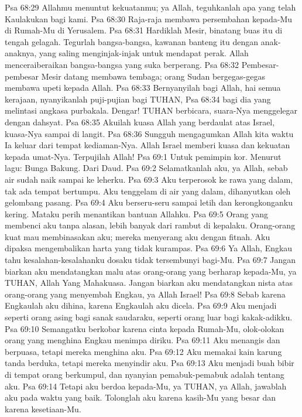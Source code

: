 Psa 68:29  Allahmu menuntut kekuatanmu; ya Allah, teguhkanlah apa yang telah Kaulakukan bagi kami.
Psa 68:30  Raja-raja membawa persembahan kepada-Mu di Rumah-Mu di Yerusalem.
Psa 68:31  Hardiklah Mesir, binatang buas itu di tengah gelagah. Tegurlah bangsa-bangsa, kawanan banteng itu dengan anak-anaknya, yang saling menginjak-injak untuk mendapat perak. Allah menceraiberaikan bangsa-bangsa yang suka berperang.
Psa 68:32  Pembesar-pembesar Mesir datang membawa tembaga; orang Sudan bergegas-gegas membawa upeti kepada Allah.
Psa 68:33  Bernyanyilah bagi Allah, hai semua kerajaan, nyanyikanlah puji-pujian bagi TUHAN,
Psa 68:34  bagi dia yang melintasi angkasa purbakala. Dengar! TUHAN berbicara, suara-Nya menggelegar dengan dahsyat.
Psa 68:35  Akuilah kuasa Allah yang berdaulat atas Israel, kuasa-Nya sampai di langit.
Psa 68:36  Sungguh mengagumkan Allah kita waktu Ia keluar dari tempat kediaman-Nya. Allah Israel memberi kuasa dan kekuatan kepada umat-Nya. Terpujilah Allah!
Psa 69:1  Untuk pemimpin kor. Menurut lagu: Bunga Bakung. Dari Daud.
Psa 69:2  Selamatkanlah aku, ya Allah, sebab air sudah naik sampai ke leherku.
Psa 69:3  Aku terperosok ke rawa yang dalam, tak ada tempat bertumpu. Aku tenggelam di air yang dalam, dihanyutkan oleh gelombang pasang.
Psa 69:4  Aku berseru-seru sampai letih dan kerongkonganku kering. Mataku perih menantikan bantuan Allahku.
Psa 69:5  Orang yang membenci aku tanpa alasan, lebih banyak dari rambut di kepalaku. Orang-orang kuat mau membinasakan aku; mereka menyerang aku dengan fitnah. Aku dipaksa mengembalikan harta yang tidak kurampas.
Psa 69:6  Ya Allah, Engkau tahu kesalahan-kesalahanku dosaku tidak tersembunyi bagi-Mu.
Psa 69:7  Jangan biarkan aku mendatangkan malu atas orang-orang yang berharap kepada-Mu, ya TUHAN, Allah Yang Mahakuasa. Jangan biarkan aku mendatangkan nista atas orang-orang yang menyembah Engkau, ya Allah Israel!
Psa 69:8  Sebab karena Engkaulah aku dihina, karena Engkaulah aku dicela.
Psa 69:9  Aku menjadi seperti orang asing bagi sanak saudaraku, seperti orang luar bagi kakak-adikku.
Psa 69:10  Semangatku berkobar karena cinta kepada Rumah-Mu, olok-olokan orang yang menghina Engkau menimpa diriku.
Psa 69:11  Aku menangis dan berpuasa, tetapi mereka menghina aku.
Psa 69:12  Aku memakai kain karung tanda berduka, tetapi mereka menyindir aku.
Psa 69:13  Aku menjadi buah bibir di tempat orang berkumpul, dan nyanyian pemabuk-pemabuk adalah tentang aku.
Psa 69:14  Tetapi aku berdoa kepada-Mu, ya TUHAN, ya Allah, jawablah aku pada waktu yang baik. Tolonglah aku karena kasih-Mu yang besar dan karena kesetiaan-Mu.
